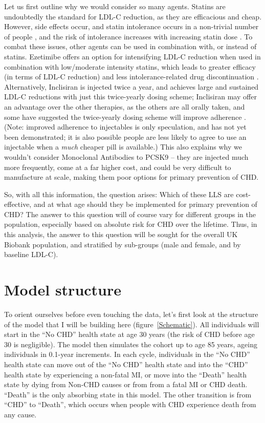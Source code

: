 \documentclass[11pt]{article}
\begin{document}
Let us first outline why we would consider so many agents. Statins are undoubtedly the standard for LDL-C reduction,
as they are efficacious and cheap. However, side effects occur, and statin intolerance occurs in a non-trivial
number of people \cite{BytyciEHJ2022}, and the risk of intolerance increases with increasing statin dose \cite{BytyciEHJ2022}. 
To combat these issues, other agents can be used in combination with, or instead of statins. Ezetimibe
offers an option for intensifying LDL-C reduction when used in combination with low/moderate intensity statins, 
which leads to greater efficacy (in terms of LDL-C reduction) and less intolerance-related drug discontinuation 
\cite{KimLancet2022,AmbeAth2014}. 
Alternatively, Inclisiran is injected twice a year, and achieves large and sustained LDL-C reductions with just this twice-yearly dosing
scheme; Inclisiran may offer an advantage over the other therapies, as the others are all orally taken, and some have suggested 
the twice-yearly dosing scheme will improve adherence \cite{GencerEHJ2022}. (Note: improved adherence to injectables is only speculation, 
and has not yet been demonstrated; it is also possible people are less likely to agree to use an injectable when a 
\emph{much} cheaper pill is available.) This also explains why we wouldn't consider Monoclonal Antibodies to PCSK9 --
they are injected much more frequently, come at a far higher cost, and could be very difficult to manufacture at scale, making them
poor options for primary prevention of CHD. 

So, with all this information, the question arises: Which of these LLS are cost-effective, and at what 
age should they be implemented for primary prevention of CHD? The answer to this question will of course vary for different
groups in the population, especially based on absolute risk for CHD over the lifetime. Thus, 
in this analysis, the answer to this question will be sought for the overall UK Biobank population, 
and stratified by sub-groups (male and female, and by baseline LDL-C). 


\pagebreak
\section{Model structure}
\label{modelstructure}

To orient ourselves before even touching the data, let's first look at the structure of the model 
that I will be building here (figure~\ref{Schematic}). All individuals will start in the 
``No CHD'' health state at age 30 years (the risk of CHD before age 30 is
negligible). The model then simulates the cohort up to age 85 years, ageing individuals in 0.1-year increments.
In each cycle, individuals in the ``No CHD'' health state can move out of the ``No CHD'' health state and 
into the ``CHD'' health state by experiencing a non-fatal MI, or move into the ``Death'' health state
by dying from Non-CHD causes or from from a fatal MI or CHD death. ``Death'' is the only absorbing
state in this model. The other transition is from ``CHD'' to ``Death'', which occurs when people with 
CHD experience death from any cause. 
\end{document}
